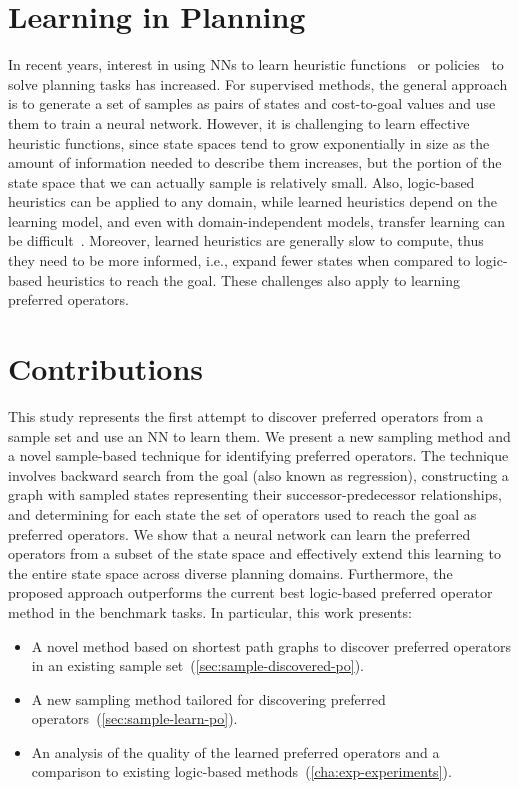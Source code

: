 \documentclass[ppgc,diss,english]{iiufrgs}
\begin{document}
\section{Learning in Planning}
\label{sec:intro-learning-planning}
In recent years, interest in using NNs to learn heuristic functions~\cite{Ferber.etal/2020a,Yu.etal/2020,Shen.etal/2020,Ferber.etal/2022,OToole/2022} or policies~\cite{Toyer.etal/2018,Toyer.etal/2020,Stahlberg.etal/2022} to solve planning tasks has increased. For supervised methods, the general approach is to generate a set of samples as pairs of states and cost-to-goal values and use them to train a neural network. However, it is challenging to learn effective heuristic functions, since state spaces tend to grow exponentially in size as the amount of information needed to describe them increases, but the portion of the state space that we can actually sample is relatively small. Also, logic-based heuristics can be applied to any domain, while learned heuristics depend on the learning model, and even with domain-independent models, transfer learning can be difficult~\cite{Shen.etal/2020}. Moreover, learned heuristics are generally slow to compute, thus they need to be more informed, i.e., expand fewer states when compared to logic-based heuristics to reach the goal. These challenges also apply to learning preferred operators.

\section{Contributions}
\label{sec:intro-contributions}
This study represents the first attempt to discover preferred operators from a sample set and use an NN to learn them. We present a new sampling method and a novel sample-based technique for identifying preferred operators. The technique involves backward search from the goal (also known as regression), constructing a graph with sampled states representing their successor-predecessor relationships, and determining for each state the set of operators used to reach the goal as preferred operators. We show that a neural network can learn the preferred operators from a subset of the state space and effectively extend this learning to the entire state space across diverse planning domains. Furthermore, the proposed approach outperforms the current best logic-based preferred operator method in the benchmark tasks. In particular, this work presents:

\begin{itemize}
\item A novel method based on shortest path graphs to discover preferred operators in an existing sample set~(\cref{sec:sample-discovered-po}).
\item A new sampling method tailored for discovering preferred operators~(\cref{sec:sample-learn-po}).
\item An analysis of the quality of the learned preferred operators and a comparison to existing logic-based methods~(\cref{cha:exp-experiments}).
\end{itemize}
%
%
\end{document}
